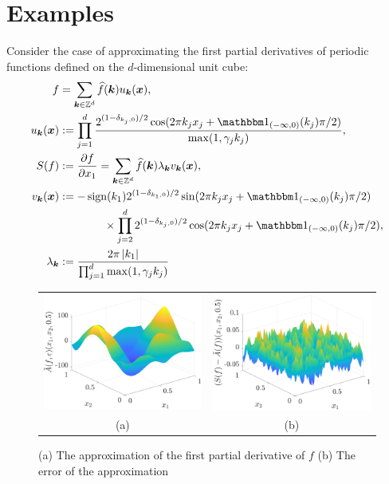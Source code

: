 \documentclass[final]{elsarticle}
\theoremstyle{definition}
\theoremstyle{remark}
\begin{document}
\section{Examples} \label{sec:examp}

Consider the case of approximating the first partial derivatives of periodic functions defined on the $d$-dimensional unit cube:
\begin{align*}
f &= \sum_{\vk \in \integers^d} \hf(\vk) u_{\vk} (\vx), \\
u_{\vk} (\vx) &:= \prod_{j=1}^d \frac{2^{(1-\delta_{k_j,0})/2}\cos(2\pi k_j x_j  + \bbone_{(-\infty,0)}(k_j) \pi/2 )}{\max(1,\gamma_j k_j)},  \\
S(f) &: = \frac{\partial f}{\partial x_1} = \sum_{\vk \in \integers^d} \hf(\vk) \lambda_{\vk} v_{\vk} (\vx), \\
v_{\vk}(\vx) & : =  -\sign(k_1) 2^{(1-\delta_{k_1,0})/2} \sin(2\pi k_j x_j  + \bbone_{(-\infty,0)}(k_j) \pi/2 ) \\
& \qquad \qquad \times \prod_{j=2}^d 2^{(1-\delta_{k_j,0})/2} \cos(2\pi k_j x_j  + \bbone_{(-\infty,0)}(k_j) \pi/2 ), \\
\lambda_{\vk} &:= \frac{2 \pi \abs{k_1}}{\prod_{j=1}^d\max(1,\gamma_j k_j)}
\end{align*}

\begin{figure}[ht]
	\centering
	\begin{tabular}{cc}
		\includegraphics[width =5.5 cm]{ProgramsImages/SimDirectSolAppx.eps} &
		\includegraphics[width = 5.5 cm]{ProgramsImages/SimDirectSolErr.eps}
		\\ (a) & (b)
	\end{tabular}
	\caption{(a) The approximation of the first partial derivative of $f$
		(b) The error of the approximation 
		\label{solfig}} %
\end{figure}
\end{document}
